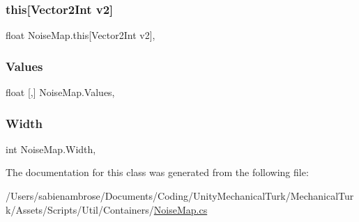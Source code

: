 \mbox{\label{class_noise_map_aa0f8f5462a066a14667ea1269edc33bd}} 
\subsubsection{\texorpdfstring{this[Vector2\+Int v2]}{this[Vector2Int v2]}}
{\footnotesize\ttfamily float Noise\+Map.\+this\mbox{[}Vector2\+Int v2\mbox{]}\hspace{0.3cm}{\ttfamily [get]}, {\ttfamily [set]}}

\mbox{\label{class_noise_map_a9ee9185c988152a2989feab0683ac664}} 
\subsubsection{\texorpdfstring{Values}{Values}}
{\footnotesize\ttfamily float \mbox{[},\mbox{]} Noise\+Map.\+Values\hspace{0.3cm}{\ttfamily [get]}, {\ttfamily [set]}}

\mbox{\label{class_noise_map_a0acc0f92acd8a77e9058c8ca446cf00a}} 
\subsubsection{\texorpdfstring{Width}{Width}}
{\footnotesize\ttfamily int Noise\+Map.\+Width\hspace{0.3cm}{\ttfamily [get]}, {\ttfamily [set]}}



The documentation for this class was generated from the following file\+:\begin{DoxyCompactItemize}
\item 
/\+Users/sabienambrose/\+Documents/\+Coding/\+Unity\+Mechanical\+Turk/\+Mechanical\+Turk/\+Assets/\+Scripts/\+Util/\+Containers/\mbox{\hyperlink{_noise_map_8cs}{Noise\+Map.\+cs}}\end{DoxyCompactItemize}
